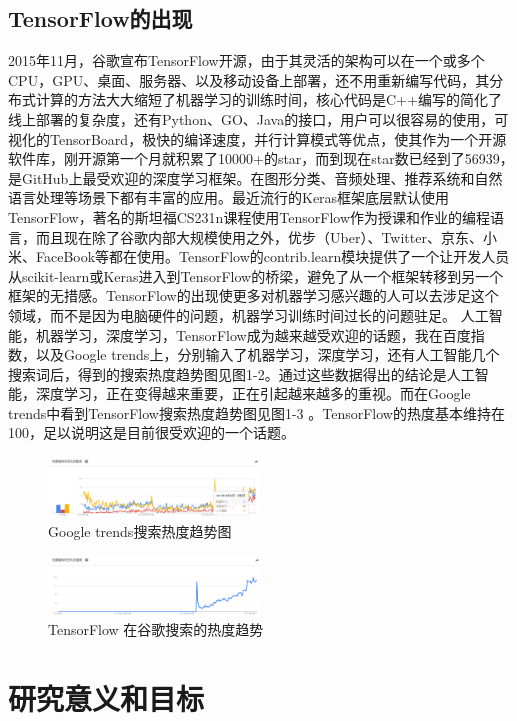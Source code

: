 		\subsection{TensorFlow的出现}	
	2015年11月，谷歌宣布TensorFlow开源，由于其灵活的架构可以在一个或多个CPU，GPU、桌面、服务器、以及移动设备上部署，还不用重新编写代码，其分布式计算的方法大大缩短了机器学习的训练时间，核心代码是C++编写的简化了线上部署的复杂度，还有Python、GO、Java的接口，用户可以很容易的使用，可视化的TensorBoard，极快的编译速度，并行计算模式等优点，使其作为一个开源软件库，刚开源第一个月就积累了10000+的star，而到现在star数已经到了56939，　是GitHub上最受欢迎的深度学习框架。在图形分类、音频处理、推荐系统和自然语言处理等场景下都有丰富的应用。最近流行的Keras框架底层默认使用TensorFlow，著名的斯坦福CS231n课程使用TensorFlow作为授课和作业的编程语言，而且现在除了谷歌内部大规模使用之外，优步（Uber）、Twitter、京东、小米、FaceBook等都在使用。TensorFlow的contrib.learn模块提供了一个让开发人员从scikit-learn或Keras进入到TensorFlow的桥梁，避免了从一个框架转移到另一个框架的无措感。TensorFlow的出现使更多对机器学习感兴趣的人可以去涉足这个领域，而不是因为电脑硬件的问题，机器学习训练时间过长的问题驻足。
	人工智能，机器学习，深度学习，TensorFlow成为越来越受欢迎的话题，我在百度指数，以及Google trends上，分别输入了机器学习，深度学习，还有人工智能几个搜索词后，得到的搜索热度趋势图见图1-2。通过这些数据得出的结论是人工智能，深度学习，正在变得越来重要，正在引起越来越多的重视。而在Google trends中看到TensorFlow搜索热度趋势图见图1-3 。TensorFlow的热度基本维持在100，足以说明这是目前很受欢迎的一个话题。
	\begin{figure}[!ht]
		\centering
		\includegraphics[width=0.5\textwidth]{figures/1-2}
		\caption{Google trends搜索热度趋势图}
	\end{figure}
	\begin{figure}[!ht]
	\centering
	\includegraphics[width=0.5\textwidth]{figures/1-3}
	\caption{TensorFlow 在谷歌搜索的热度趋势}
	\end{figure}
	\section{研究意义和目标}
